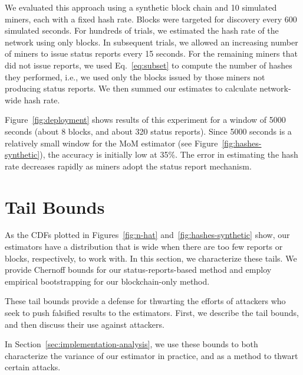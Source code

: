 \documentclass[10pt,sigconf]{acmart}
\newcommand{\1}{{\em (i)}}
\newcommand{\2}{{\em (ii)}}
\newcommand{\3}{{\em (iii)}}
\newcommand{\4}{{\em (iv)}}
\newcommand{\5}{{\em (v)}}
\begin{document}
We evaluated this approach using a synthetic block chain and 10 simulated miners, each with a fixed hash rate. Blocks were targeted for discovery every 600 simulated seconds. For hundreds of trials, we estimated the  hash rate of the network using only blocks. In subsequent trials, we allowed an increasing number of miners to issue status reports every 15 seconds. For the remaining miners that did not issue reports, we used  Eq.~\ref{eq:subset} to compute the number of hashes they
performed, i.e.,  we used only the blocks
issued by those miners not producing status reports. We then summed our
estimates to calculate network-wide hash rate.

Figure~\ref{fig:deployment} shows results of this experiment for a window of 5000 seconds (about 8 blocks, and about 320 status reports). Since 5000 seconds is a relatively small window for the MoM estimator (see Figure~\ref{fig:hashes-synthetic}), the accuracy is initially low at 35\%. The error in estimating the
hash rate decreases rapidly as  miners  adopt the  status
report mechanism. 



\section{Tail Bounds}\label{sec:bounds}

As the CDFs plotted in Figures~\ref{fig:n-hat} and~\ref{fig:hashes-synthetic} show, our estimators have a distribution that is wide when there are too  few  reports or blocks, respectively, to work with.  In this section, we characterize these tails. We provide Chernoff bounds for our status-reports-based method and employ empirical bootstrapping for our blockchain-only method.

These tail bounds provide a defense for thwarting the efforts of attackers who seek to push falsified results to the estimators.  First, we describe the tail bounds, and then discuss their use against attackers. 

In Section~\ref{sec:implementation-analysis}, we use these bounds to both characterize the variance of our estimator in practice, and as a method to thwart certain attacks. 
\end{document}

